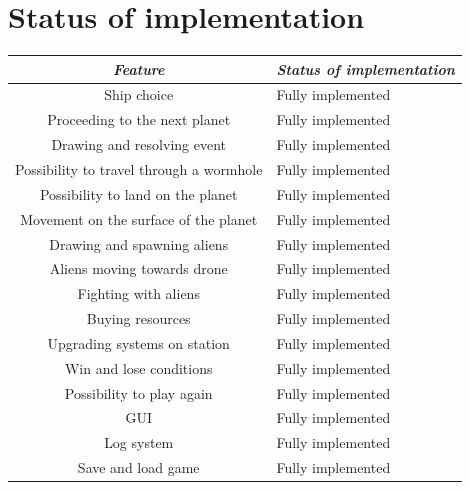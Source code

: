 \documentclass[a4paper,12pt]{article}
\begin{document}
\section{Status of implementation}
\begin{table}[H]
		\begin{tabularx}{\linewidth}{|c|X|}
			\hline
			\textit{\textbf{Feature}} & \textit{\textbf{Status of implementation}}\\
			\hline
			Ship choice & Fully implemented\\
			\hline
			Proceeding to the next planet & Fully implemented\\
			\hline
			Drawing and resolving event & Fully implemented\\
			\hline
			Possibility to travel through a wormhole & Fully implemented\\
			\hline
			Possibility to land on the planet & Fully implemented\\
			\hline
			Movement on the surface of the planet & Fully implemented\\
			\hline
			Drawing and spawning aliens & Fully implemented\\
			\hline
			Aliens moving towards drone & Fully implemented\\
			\hline
			Fighting with aliens & Fully implemented\\
			\hline
			Buying resources & Fully implemented\\
			\hline
			Upgrading systems on station & Fully implemented\\
			\hline
			Win and lose conditions & Fully implemented\\
			\hline
			Possibility to play again & Fully implemented\\
			\hline
			GUI & Fully implemented\\
			\hline
			Log system & Fully implemented\\
			\hline
			Save and load game & Fully implemented\\
			\hline
			\end{tabularx}
\end{table}
\end{document}
